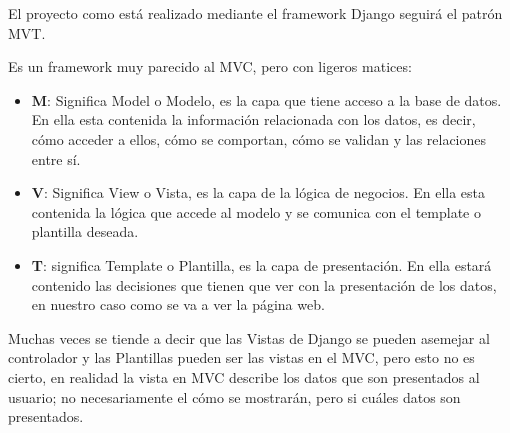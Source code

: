 El proyecto como está realizado mediante el framework Django seguirá el patrón MVT\cite{MVT}.

Es un framework muy parecido al MVC, pero con ligeros matices:
\begin{itemize}
	\item \textbf{M}: Significa Model o Modelo, es la capa que tiene acceso a la base de datos. En ella esta contenida la información relacionada con los datos, es decir, cómo acceder a ellos, cómo se comportan, cómo se validan y las relaciones entre sí.
	\item \textbf{V}: Significa View o Vista, es la capa de la lógica de negocios. En ella esta contenida la lógica que accede al modelo y se comunica con el template o plantilla deseada. 
	\item \textbf{T}: significa Template o Plantilla, es la capa de presentación. En ella estará contenido las decisiones que tienen que ver con la presentación de los datos, en nuestro caso como se va a ver la página web.
\end{itemize}

Muchas veces se tiende a decir que las Vistas de Django se pueden asemejar al controlador y las Plantillas pueden ser las vistas en el MVC, pero esto no es cierto, en realidad la vista en MVC describe los datos que son presentados al usuario; no necesariamente el cómo se mostrarán, pero si cuáles datos son presentados.